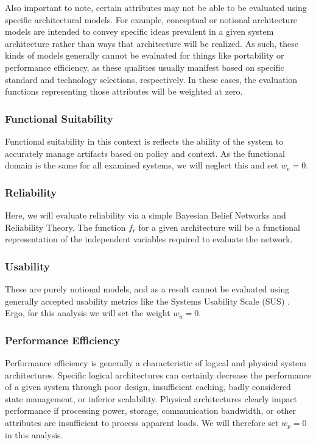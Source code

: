 Also important to note, certain attributes may not be able to be evaluated using specific architectural models.  For example, conceptual or notional architecture models are intended to convey specific ideas prevalent in a given system architecture rather than ways that architecture will be realized.  As such, these kinds of models generally cannot be evaluated for things like portability or performance efficiency, as these qualities usually manifest based on specific standard and technology selections, respectively.  In these cases, the evaluation functions representing those attributes will be weighted at zero.

\subsubsection*{Functional Suitability}
Functional suitability in this context is reflects the ability of the system to accurately manage artifacts based on policy and context.  As the functional domain is the same for all examined systems, we will neglect this and set $ w_{e} = 0 $.

\subsubsection*{Reliability}
Here, we will evaluate reliability via a simple Bayesian Belief Networks and Reliability Theory.  The function $ f_{r} $ for a given architecture will be a functional representation of the independent variables required to evaluate the network.

\subsubsection*{Usability}
These are purely notional models, and as a result cannot be evaluated using generally accepted usability metrics like the Systems Usability Scale (SUS) \cite{proposal:sus}.  Ergo, for this analysis we will set the weight $w_{u} = 0$.

\subsubsection*{Performance Efficiency}
Performance efficiency is generally a characteristic of logical and physical system architectures.  Specific logical architectures can certainly decrease the performance of a given system through poor design, insufficient caching, badly considered state management, or inferior scalability.  Physical architectures clearly impact performance if processing power, storage, communication bandwidth, or other attributes are insufficient to process apparent loads.  We will therefore set $w_{p} = 0$ in this analysis.

